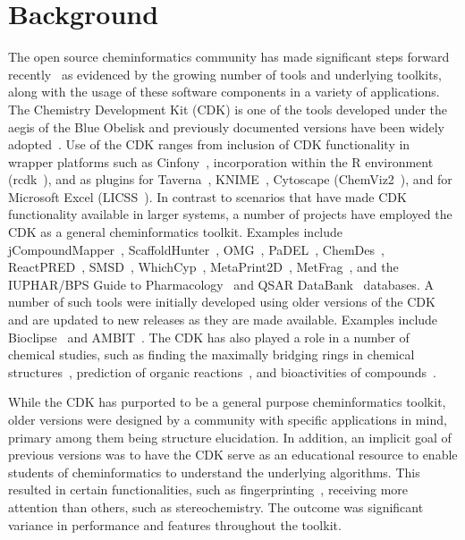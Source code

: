\documentclass[doublespacing]{bmcart}
\begin{document}
\section*{Background}

The open source cheminformatics community has made significant steps
forward recently~\cite{OBoyle2011b} as evidenced by the growing number
of tools and underlying toolkits, along with the usage of these
software components in a variety of applications.
The Chemistry Development Kit (CDK) is one of the tools developed
under the aegis of the Blue Obelisk 
and previously documented versions have been widely adopted~\cite{Steinbeck2003,Steinbeck2006}.
Use of the CDK ranges from inclusion of CDK functionality in
wrapper platforms such as Cinfony~\cite{OBoyle2008}, incorporation
within the R environment (rcdk~\cite{Guha2007}), and as plugins for
Taverna~\cite{Truszkowski2011}, 
KNIME~\cite{Beisken2013}, Cytoscape (ChemViz2~\cite{ChemViz2}), and for
Microsoft Excel (LICSS~\cite{Lawson2012}).
In contrast to scenarios that have made CDK functionality available in
larger systems, a number of projects have employed the CDK as a
general cheminformatics toolkit. Examples include 
jCompoundMapper~\cite{Hinselmann2011}, ScaffoldHunter~\cite{wetzel2009interactive,Klein2013}, OMG~\cite{Peironcely2012},
PaDEL~\cite{yap2011padel}, ChemDes~\cite{Dong2015},
ReactPRED~\cite{ReactPRED}, SMSD~\cite{Rahman2009,Rahman2014,Rahman2016},
WhichCyp~\cite{Rostkowski2013}, MetaPrint2D~\cite{Carlsson2010}, MetFrag~\cite{Wolf2010},
and the IUPHAR/BPS Guide to Pharmacology~\cite{Southan2016} and
QSAR DataBank~\cite{Ruusmann2015} databases.
A number of such tools were initially developed using older versions
of the CDK and are updated to new releases as they are made
available. Examples include Bioclipse~\cite{spjuth2007bioclipse,
spjuth2009bioclipse} and
AMBIT~\cite{jeliazkova2011ambit,jeliazkova2011ambitsmarts,kochev2013ambit}. The
CDK has also played a role in a number of chemical studies, such as finding
the maximally bridging rings in chemical structures~\cite{Marth2015},
prediction of organic reactions~\cite{Segler2016}, and bioactivities
of compounds~\cite{Alvarsson2016}.

While the CDK has purported to be a general purpose cheminformatics
toolkit, older versions were designed by a community with specific
applications in mind, primary among them being structure elucidation. In
addition, an implicit goal of previous versions was to have the CDK
serve as an educational resource to enable students of cheminformatics
to understand the underlying algorithms. This resulted in certain
functionalities, such as fingerprinting~\cite{Clark2014,Cannon2006},
receiving more attention than others, such as stereochemistry. The
outcome was significant variance in performance and features
throughout the toolkit.
\end{document}
